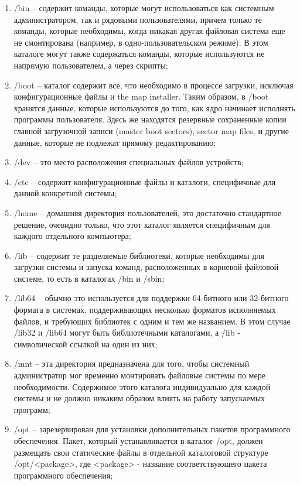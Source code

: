 \begin{enumerate}
    \item /bin -- содержит команды, которые могут использоваться как системным администратором, так и рядовыми пользователями, причем только те команды, которые необходимы, когда никакая другая файловая система еще не смонтирована (например, в одно-пользовательском режиме). В этом каталоге могут также содержаться команды, которые используются не напрямую пользователем, а через скрипты;
    \item /boot -- каталог содержит все, что необходимо в процессе загрузки, исключая конфигурационные файлы и the map installer. Таким образом, в /boot хранятся данные, которые используются до того, как ядро начинает исполнять программы пользователя. Здесь же находятся резервные сохраненные копии главной загрузочной записи (master boot sectors), sector map files, и другие данные, которые не подлежат прямому редактированию;
    \item /dev -- это место расположения специальных файлов устройств;
    \item /etc -- содержит конфигурационные файлы и каталоги, специфичные для данной конкретной системы;
    \item /home -- домашняя директория пользователей, это достаточно стандартное решение, очевидно только, что этот каталог является специфичным для каждого отдельного компьютера;
    \item /lib -- содержит те разделяемые библиотеки, которые необходимы для загрузки системы и запуска команд, расположенных в корневой файловой системе, то есть в каталогах /bin и /sbin;
    \item /lib64 --  обычно это используется для поддержки 64-битного или 32-битного формата в системах, поддерживающих несколько форматов исполняемых файлов, и требующих библиотек с одним и тем же названием. В этом случае /lib32 и /lib64 могут быть библиотечными каталогами, а /lib - символической ссылкой на один из них;
    \item /mnt -- эта директория предназначена для того, чтобы системный администратор мог временно монтировать файловые системы по мере необходимости. Содержимое этого каталога индивидуально для каждой системы и не должно никаким образом влиять на работу запускаемых программ;
    \item /opt -- зарезервирован для установки дополнительных пакетов программного обеспечения. Пакет, который устанавливается в каталог /opt, должен размещать свои статические файлы в отдельной каталоговой структуре /opt/<package>, где <package> - название соответствующего пакета программного обеспечения;

\end{enumerate}
